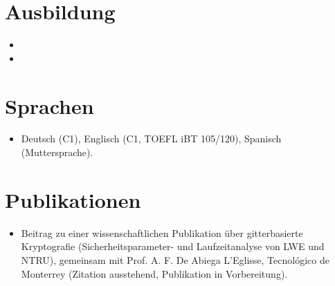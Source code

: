 \documentclass[11pt,a4paper,sans]{moderncv}
\begin{document}
\section{Ausbildung}
\vspace{1pt}
\begin{itemize}

\item{}

\vspace{3pt}

\item{}

\end{itemize}


\section{Sprachen}
\vspace{1pt}
\begin{itemize}
\item Deutsch (C1), Englisch (C1, TOEFL iBT 105/120), Spanisch (Muttersprache).
\end{itemize}


\section{Publikationen}
\vspace{1pt}
\begin{itemize}
\item Beitrag zu einer wissenschaftlichen Publikation über gitterbasierte Kryptografie (Sicherheitsparameter- und Laufzeitanalyse von LWE und NTRU), gemeinsam mit Prof. A. F. De Abiega L'Eglisse, Tecnológico de Monterrey (Zitation ausstehend, Publikation in Vorbereitung).
\end{itemize}
\end{document}
